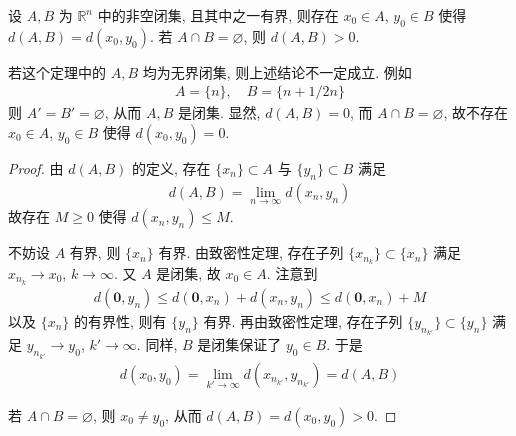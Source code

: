 \documentclass[../../main.tex]{subfiles}
\begin{document}
\begin{theorem}
设 $A, B$ 为 $\mathbb{R}^n$ 中的非空闭集, 且其中之一有界, 则存在 $x_0 \in A$, $y_0 \in B$ 使得 $d(A, B) = d(x_0, y_0)$. 若 $A \cap B = \varnothing$, 则 $d(A, B) > 0$.
\end{theorem}
\begin{remark}
若这个定理中的 $A, B$ 均为无界闭集, 则上述结论不一定成立. 例如
\begin{align*}
A = \{n\}, \quad B = \{n + 1/2n\}
\end{align*}
则 $A' = B' = \varnothing$, 从而 $A, B$ 是闭集. 显然, $d(A, B) = 0$, 而 $A \cap B = \varnothing$, 故不存在 $x_0 \in A$, $y_0 \in B$ 使得 $d(x_0, y_0) = 0$.
\end{remark}
\begin{proof}
由 $d(A, B)$ 的定义, 存在 $\{x_n\} \subset A$ 与 $\{y_n\} \subset B$ 满足
\begin{align*}
d(A, B) = \lim_{n \to \infty} d(x_n, y_n)
\end{align*}
故存在 $M \geqslant 0$ 使得 $d(x_n, y_n) \leqslant M$.

不妨设 $A$ 有界, 则 $\{x_n\}$ 有界. 由致密性定理, 存在子列 $\{x_{n_k}\} \subset \{x_n\}$ 满足 $x_{n_k} \to x_0$, $k \to \infty$. 又 $A$ 是闭集, 故 $x_0 \in A$. 注意到
\begin{align*}
d(\mathbf{0}, y_n) \leqslant d(\mathbf{0}, x_n) + d(x_n, y_n) \leqslant d(\mathbf{0}, x_n) + M
\end{align*}
以及 $\{x_n\}$ 的有界性, 则有 $\{y_n\}$ 有界. 再由致密性定理, 存在子列 $\{y_{n_{k'}}\} \subset \{y_n\}$ 满足 $y_{n_{k'}} \to y_0$, $k' \to \infty$. 同样, $B$ 是闭集保证了 $y_0 \in B$. 于是
\begin{align*}
d(x_0, y_0) = \lim_{k' \to \infty} d(x_{n_{k'}}, y_{n_{k'}}) = d(A, B)
\end{align*}

若 $A \cap B = \varnothing$, 则 $x_0 \neq y_0$, 从而 $d(A, B) = d(x_0, y_0) > 0$.

\end{proof}
\end{document}
